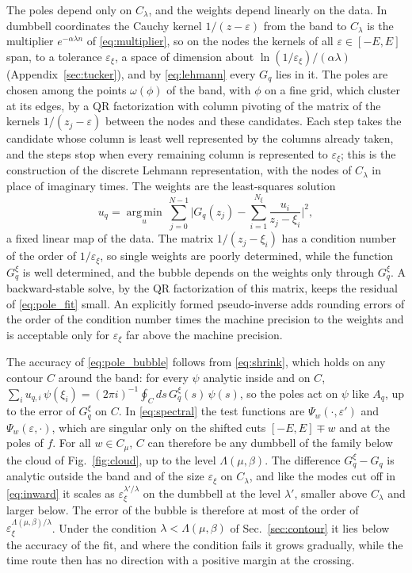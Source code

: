 \documentclass[aps,prb,reprint,a4paper]{revtex4-2}
\begin{document}
The poles depend only on $C_\lambda$, and the weights depend linearly on the data. In dumbbell coordinates the Cauchy kernel $1/(z-\varepsilon)$ from the band to $C_\lambda$ is the multiplier $e^{-\alpha\lambda n}$ of \eqref{eq:multiplier}, so on the nodes the kernels of all $\varepsilon\in[-E,E]$ span, to a tolerance $\varepsilon_\xi$, a space of dimension about $\ln(1/\varepsilon_\xi)/(\alpha\lambda)$ (Appendix~\ref{sec:tucker}), and by \eqref{eq:lehmann} every $G_q$ lies in it. The poles are chosen among the points $\omega(\phi)$ of the band, with $\phi$ on a fine grid, which cluster at its edges, by a QR factorization with column pivoting of the matrix of the kernels $1/(z_j-\varepsilon)$ between the nodes and these candidates. Each step takes the candidate whose column is least well represented by the columns already taken, and the steps stop when every remaining column is represented to $\varepsilon_\xi$; this is the construction of the discrete Lehmann representation, with the nodes of $C_\lambda$ in place of imaginary times. The weights are the least-squares solution
\begin{equation}
  u_q=\operatorname*{arg\,min}_u\,\sum_{j=0}^{N-1}\Big\lvert G_q(z_j)-\sum_{i=1}^{N_\xi}\frac{u_i}{z_j-\xi_i}\Big\rvert^2,
  \label{eq:pole_fit}
\end{equation}
a fixed linear map of the data. The matrix $1/(z_j-\xi_i)$ has a condition number of the order of $1/\varepsilon_\xi$, so single weights are poorly determined, while the function $G^\xi_q$ is well determined, and the bubble depends on the weights only through $G^\xi_q$. A backward-stable solve, by the QR factorization of this matrix, keeps the residual of \eqref{eq:pole_fit} small. An explicitly formed pseudo-inverse adds rounding errors of the order of the condition number times the machine precision to the weights and is acceptable only for $\varepsilon_\xi$ far above the machine precision.

The accuracy of \eqref{eq:pole_bubble} follows from \eqref{eq:shrink}, which holds on any contour $C$ around the band: for every $\psi$ analytic inside and on $C$, $\sum_iu_{q,i}\,\psi(\xi_i)=(2\pi i)^{-1}\oint_Cds\,G^\xi_q(s)\,\psi(s)$, so the poles act on $\psi$ like $A_q$, up to the error of $G^\xi_q$ on $C$. In \eqref{eq:spectral} the test functions are $\Psi_w(\cdot,\varepsilon')$ and $\Psi_w(\varepsilon,\cdot)$, which are singular only on the shifted cuts $[-E,E]\mp w$ and at the poles of $f$. For all $w\in C_\mu$, $C$ can therefore be any dumbbell of the family below the cloud of Fig.~\ref{fig:cloud}, up to the level $\Lambda(\mu,\beta)$. The difference $G^\xi_q-G_q$ is analytic outside the band and of the size $\varepsilon_\xi$ on $C_\lambda$, and like the modes cut off in \eqref{eq:inward} it scales as $\varepsilon_\xi^{\lambda'/\lambda}$ on the dumbbell at the level $\lambda'$, smaller above $C_\lambda$ and larger below. The error of the bubble is therefore at most of the order of $\varepsilon_\xi^{\Lambda(\mu,\beta)/\lambda}$. Under the condition $\lambda<\Lambda(\mu,\beta)$ of Sec.~\ref{sec:contour} it lies below the accuracy of the fit, and where the condition fails it grows gradually, while the time route then has no direction with a positive margin at the crossing.
\end{document}
